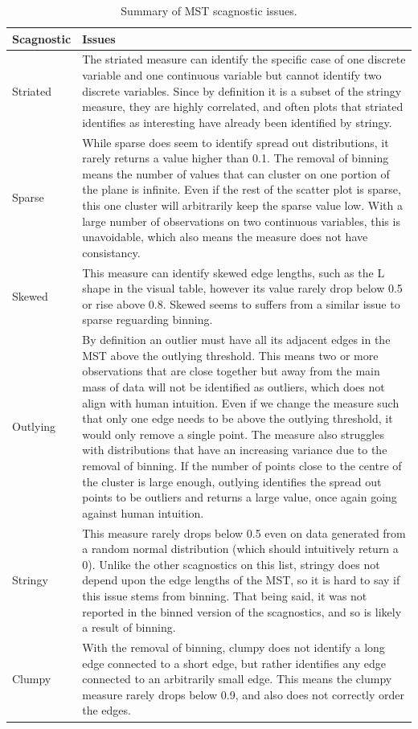 \begin{Schunk}
\begin{table}

\caption{\label{tab:scagissues-tb-pdf}Summary of MST scagnostic issues.}
\centering
\begin{tabular}[t]{l>{\raggedright\arraybackslash}p{12cm}}
\toprule
Scagnostic & Issues\\
\midrule
Striated & The striated measure can identify the specific case of one discrete variable and one continuous variable but cannot identify two discrete variables. Since by definition it is a subset of the stringy measure, they are highly correlated, and often plots that striated identifies as interesting have already been identified by stringy.\\
Sparse & While sparse does seem to identify spread out distributions, it rarely returns a value higher than 0.1. The removal of binning means the number of values that can cluster on one portion of the plane is infinite. Even if the rest of the scatter plot is sparse, this one cluster will arbitrarily keep the sparse value low. With a large number of observations on two continuous variables, this is unavoidable, which also means the measure does not have consistancy.\\
Skewed & This measure can identify skewed edge lengths, such as the L shape in the visual table, however its value rarely drop below 0.5 or rise above 0.8. Skewed seems to suffers from a similar issue to sparse reguarding binning.\\
Outlying & By definition an outlier must have all its adjacent edges in the MST above the outlying threshold. This means two or more observations that are close together but away from the main mass of data will not be identified as outliers, which does not align with human intuition. Even if we change the measure such that only one edge needs to be above the outlying threshold, it would only remove a single point. The measure also struggles with distributions that have an increasing variance due to the removal of binning. If the number of points close to the centre of the cluster is large enough, outlying identifies the spread out points to be outliers and returns a large value, once again going against human intuition.\\
Stringy & This measure rarely drops below 0.5 even on data generated from a random normal distribution (which should intuitively return a 0). Unlike the other scagnostics on this list, stringy does not depend upon the edge lengths of the MST, so it is hard to say if this issue stems from binning. That being said, it was not reported in the binned version of the scagnostics, and so is likely a result of binning.\\
\addlinespace
Clumpy & With the removal of binning, clumpy does not identify a long edge connected to a short edge, but rather identifies any edge connected to an arbitrarily small edge. This means the clumpy measure rarely drops below 0.9, and also does not correctly order the edges.\\
\bottomrule
\end{tabular}
\end{table}

\end{Schunk}

